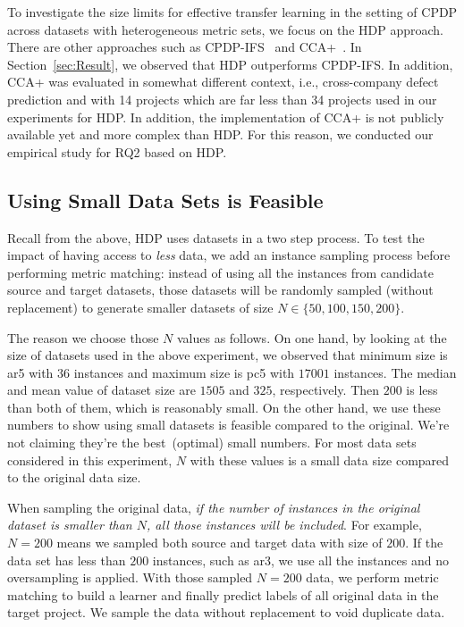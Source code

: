 To investigate the size limits for effective transfer learning in the setting of CPDP across datasets with heterogeneous metric sets, we focus on the HDP approach. There are other approaches such as CPDP-IFS~\cite{He14} and CCA+~\cite{Jing15}. In Section~\ref{sec:Result}, we observed that HDP outperforms CPDP-IFS. In addition, CCA+ was evaluated in somewhat different context, i.e., cross-company defect prediction and with 14 projects which are far less than 34 projects used in our experiments for HDP. In addition, the implementation of CCA+ is not publicly available yet and more complex than HDP. For this reason, we conducted our empirical study for RQ2 based on HDP.



 
\subsection{Using Small Data Sets is Feasible}

Recall from the above,
HDP uses  datasets  in a two step process.
To test the impact of having access to {\em less} data,
we  add an instance sampling process before performing metric matching:
instead of using all the instances from
candidate source and target datasets, those datasets will
be randomly sampled (without replacement) to generate smaller datasets of
size $N \in \{50, 100, 150, 200\}$. 

The reason we choose those $N$ values as follows. On one hand, by looking at the size of datasets used in the
above experiment, we observed that minimum size is ar5 with $36$ instances and maximum size is pc5 with $17001$ instances.
The median and mean value of dataset size are $1505$ and $325$, respectively. Then $200$ is less than both of 
them, which is reasonably small.
On the other hand, we use these numbers to show using small datasets is feasible compared to
the original. We're not claiming they're the best~(optimal) small numbers. For most data sets considered in this experiment, $N$ with these values is a 
small data size compared to the original data size. 

When sampling the original data, {\it if
the number of instances in the original dataset is
smaller than $N$, all those instances will be
included}. For example, $N=200$ means we sampled both source and target data with size of $200$. If the data set has less than $200$ instances, such as ar3, we use all
the instances and no oversampling is applied. With those sampled $N=200$ data, we perform metric matching to build a learner
and finally predict labels of all original data in the target project. We sample the data without replacement
to void duplicate data.

